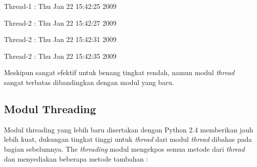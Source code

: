 \begin{center}{\fontsize{10pt}{10pt}\selectfont Thread-1 : Thu Jan 22 15:42:25 2009}\end{center} 
 
\begin{center}{\fontsize{10pt}{10pt}\selectfont Thread-2 : Thu Jan 22 15:42:27 2009}\end{center} 
 
\begin{center}{\fontsize{10pt}{10pt}\selectfont Thread-2 : Thu Jan 22 15:42:31 2009}\end{center} 
 
\begin{center}{\fontsize{10pt}{10pt}\selectfont Thread-2 : Thu Jan 22 15:42:35 2009}\end{center} 

\vspace{12pt}
\hspace*{0.5in} Meskipun sangat efektif untuk benang tingkat rendah, namun modul \textit{thread} sangat terbatas dibandingkan dengan modul yang baru. 
\vspace{12pt}

\subsection{Modul Threading } 
\hspace*{0.5in} Modul threading yang lebih baru disertakan dengan Python 2.4 memberikan jauh lebih kuat, dukungan tingkat tinggi untuk \textit{thread}\textit{ }dari modul\textit{ }\textit{thread}\textit{ }dibahas pada bagian sebelumnya. The \textit{thread}\textit{ing }modul mengekpos semua metode dari \textit{thread}\textit{ }dan menyediakan beberapa metode tambahan : 

